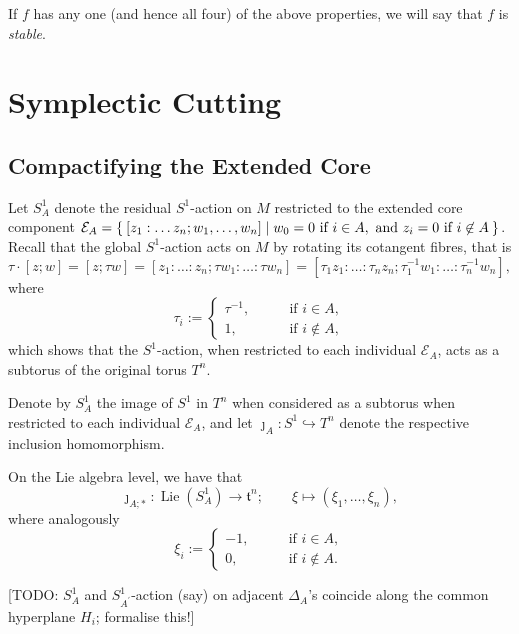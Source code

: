 \documentclass{article}
\newcommand{\lra}{\longrightarrow}
\newcommand{\mcE}{\mathcal{E}}
\newcommand{\mft}{\mathfrak{t}}
\DeclareMathOperator{\Lie}{Lie}
\begin{document}
	If $f$ has any one (and hence all four) of the above properties, we will say that $f$ is \emph{stable}.
	
	\section{Symplectic Cutting}
	
	\subsection{Compactifying the Extended Core}
	
	Let $S_{A}^{1}$ denote the residual $S^{1}$-action on $M$ restricted to the extended core component $\mcE_{A} = \Set{ [z_{1}: \ldots z_{n}; w_{1}, \ldots, w_{n}] | w_{0} = 0 \text{ if } i \in A, \text{ and } z_{i} = 0 \text{ if } i \not\in A  }$. Recall that the global $S^{1}$-action acts on $M$ by rotating its cotangent fibres, that is
	\[
		\tau \cdot [z; w] = [z; \tau w] = [z_{1} : \ldots : z_{n} ; \tau w_{1} : \ldots : \tau w_{n} ] = [\tau_{1 }z_{1} : \ldots : \tau_{n}z_{n} ; \tau_{1}^{-1}w_{1} : \ldots : \tau_{n}^{-1} w_{n} ],
	\]
	where
	\[
		\tau_{i} :=
		\begin{cases}
			\tau^{-1}, \qquad &\text{if } i \in A, \\
			1, \qquad &\text{if } i \not\in A,
		\end{cases}
	\]
	which shows that the $S^{1}$-action, when restricted to each individual $\mcE_{A}$, acts as a subtorus of the original torus $T^{n}$.
	
	Denote by $S_{A}^{1}$ the image of $S^{1}$ in $T^{n}$ when considered as a subtorus when restricted to each individual $\mcE_{A}$, and let $\jmath_{A} : S^{1} \hookrightarrow T^{n}$ denote the respective inclusion homomorphism.
	
	On the Lie algebra level, we have that
	\[
		\jmath_{A; \ast} : \Lie(S_{A}^{1})  \lra \mft^{n}; \qquad \xi \longmapsto ( \xi_{1}, \ldots, \xi_{n}),
	\]
	where analogously
	\[
		\xi_{i} :=
		\begin{cases}
			-1, \qquad &\text{if } i \in A, \\
			0, \qquad &\text{if } i \not\in A.
		\end{cases}
	\]
	
	[TODO: $S^{1}_{A}$ and $S_{A^{\prime}}^{1}$-action (say) on adjacent $\Delta_{A}$'s coincide along the common hyperplane $H_{i}$; formalise this!]	
	
	
	
	
	
	  
	
	
\end{document}
